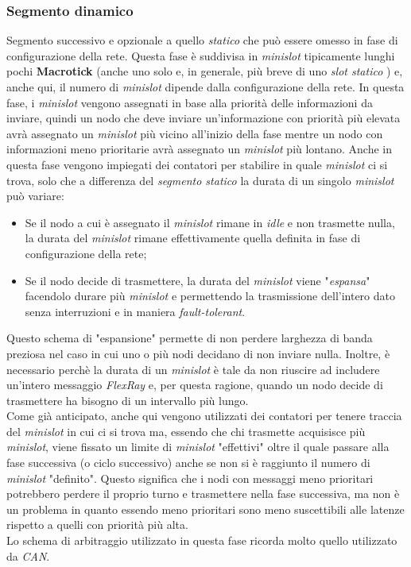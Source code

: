 \subsubsection{Segmento dinamico}
Segmento successivo e opzionale a quello \emph{statico} che può essere omesso in fase di configurazione della rete. Questa fase è suddivisa in \emph{minislot} tipicamente lunghi pochi \textbf{Macrotick} (anche uno solo e, in generale, più breve di uno \emph{slot statico} \cite{eos_flexray}) e, anche qui, il numero di \emph{minislot} dipende dalla configurazione della rete. In questa fase, i \emph{minislot} vengono assegnati in base alla priorità delle informazioni da inviare, quindi un nodo che deve inviare un'informazione con priorità più elevata avrà assegnato un \emph{minislot} più vicino all'inizio della fase mentre un nodo con informazioni meno prioritarie avrà assegnato un \emph{minislot} più lontano. Anche in questa fase vengono impiegati dei contatori per stabilire in quale \emph{minislot} ci si trova, solo che a differenza del \emph{segmento statico} la durata di un singolo \emph{minislot} può variare:
\begin{itemize}
    \item Se il nodo a cui è assegnato il \emph{minislot} rimane in \emph{idle} e non trasmette nulla, la durata del \emph{minislot} rimane effettivamente quella definita in fase di configurazione della rete;
    \item Se il nodo decide di trasmettere, la durata del \emph{minislot} viene "\emph{espansa}" facendolo durare più \emph{minislot} e permettendo la trasmissione dell'intero dato senza interruzioni e in maniera \emph{fault-tolerant}.
\end{itemize}

Questo schema di "espansione" permette di non perdere larghezza di banda preziosa nel caso in cui uno o più nodi decidano di non inviare nulla. Inoltre, è necessario perchè la durata di un \emph{minislot} è tale da non riuscire ad includere un'intero messaggio \emph{FlexRay} e, per questa ragione, quando un nodo decide di trasmettere ha bisogno di un intervallo più lungo.\\
Come già anticipato, anche qui vengono utilizzati dei contatori per tenere traccia del \emph{minislot} in cui ci si trova ma, essendo che chi trasmette acquisisce più \emph{minislot}, viene fissato un limite di \emph{minislot} "effettivi" oltre il quale passare alla fase successiva (o ciclo successivo) anche se non si è raggiunto il numero di \emph{minislot} "definito". Questo significa che i nodi con messaggi meno prioritari potrebbero perdere il proprio turno e trasmettere nella fase successiva, ma non è un problema in quanto essendo meno prioritari sono meno suscettibili alle latenze rispetto a quelli con priorità più alta. \cite{eos_flexray} \cite{flexray_specification}\\
Lo schema di arbitraggio utilizzato in questa fase ricorda molto quello utilizzato da \emph{CAN}.

